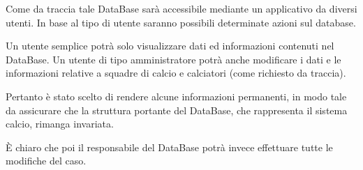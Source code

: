 \bigskip
\bigskip

Come da traccia tale DataBase sarà accessibile mediante un applicativo da diversi utenti.
In base al tipo di utente saranno possibili
determinate azioni sul database.

Un utente semplice potrà solo visualizzare dati ed informazioni contenuti nel DataBase.
Un utente di tipo amministratore potrà anche modificare i dati e le informazioni relative a
squadre di calcio e calciatori (come richiesto da traccia).

Pertanto è stato scelto di rendere alcune informazioni permanenti, in modo tale da assicurare
che la struttura portante del DataBase, che rappresenta il sistema calcio, rimanga invariata.

È chiaro che poi il responsabile del DataBase potrà invece effettuare tutte le modifiche del caso.